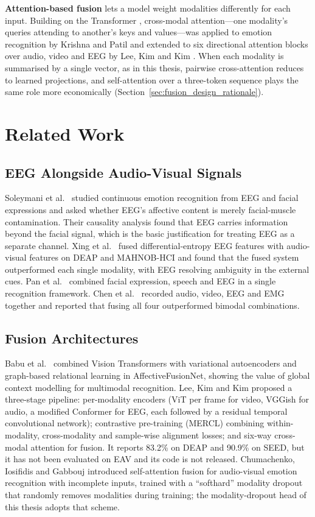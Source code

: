 \textbf{Attention-based fusion} lets a model weight modalities differently for each input. Building on the Transformer \cite{Vaswani2017Attention}, cross-modal attention---one modality's queries attending to another's keys and values---was applied to emotion recognition by Krishna and Patil \cite{KrishnaPatil2020Interspeech} and extended to six directional attention blocks over audio, video and EEG by Lee, Kim and Kim \cite{Lee2024MERCL}. When each modality is summarised by a single vector, as in this thesis, pairwise cross-attention reduces to learned projections, and self-attention over a three-token sequence plays the same role more economically (Section~\ref{sec:fusion_design_rationale}).

\section{Related Work}

\subsection{EEG Alongside Audio-Visual Signals}
Soleymani et al.\ \cite{Soleymani2016EEGFacial} studied continuous emotion recognition from EEG and facial expressions and asked whether EEG's affective content is merely facial-muscle contamination. Their causality analysis found that EEG carries information beyond the facial signal, which is the basic justification for treating EEG as a separate channel. Xing et al.\ \cite{Xing2019EEGAudioVisual} fused differential-entropy EEG features with audio-visual features on DEAP and MAHNOB-HCI and found that the fused system outperformed each single modality, with EEG resolving ambiguity in the external cues. Pan et al.\ \cite{Pan2024OJEMB} combined facial expression, speech and EEG in a single recognition framework. Chen et al.\ \cite{Chen2022EAV} recorded audio, video, EEG and EMG together and reported that fusing all four outperformed bimodal combinations.

\subsection{Fusion Architectures}
Babu et al.\ \cite{Babu2024AffectiveFusionNet} combined Vision Transformers with variational autoencoders and graph-based relational learning in AffectiveFusionNet, showing the value of global context modelling for multimodal recognition. Lee, Kim and Kim \cite{Lee2024MERCL} proposed a three-stage pipeline: per-modality encoders (ViT per frame for video, VGGish for audio, a modified Conformer for EEG, each followed by a residual temporal convolutional network); contrastive pre-training (MERCL) combining within-modality, cross-modality and sample-wise alignment losses; and six-way cross-modal attention for fusion. It reports 83.2\% on DEAP and 90.9\% on SEED, but it has not been evaluated on EAV and its code is not released. Chumachenko, Iosifidis and Gabbouj \cite{Chumachenko2022SelfAttention} introduced self-attention fusion for audio-visual emotion recognition with incomplete inputs, trained with a ``softhard'' modality dropout that randomly removes modalities during training; the modality-dropout head of this thesis adopts that scheme.


